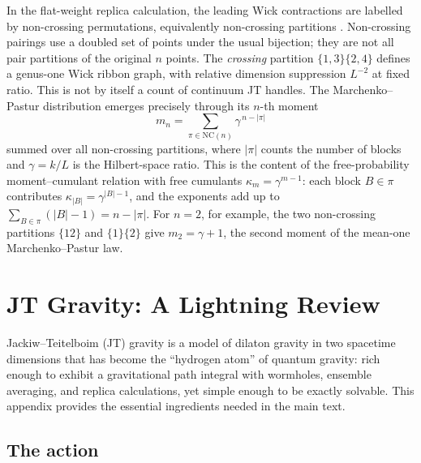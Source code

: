 \documentclass[11pt,letterpaper]{article}
\theoremstyle{plain}
\theoremstyle{definition}
\theoremstyle{remark}
\begin{document}
In the flat-weight replica calculation, the leading Wick contractions are
labelled by non-crossing permutations, equivalently non-crossing partitions
\cite{speicher1994,voiculescu1991}.  Non-crossing pairings use a doubled set
of points under the usual bijection; they are not all pair partitions of the
original $n$ points.  The \emph{crossing} partition
$\{1,3\}\{2,4\}$ defines a genus-one Wick ribbon graph, with relative dimension suppression
$L^{-2}$ at fixed ratio.  This is not by itself a count of continuum JT handles.  The Marchenko--Pastur
distribution emerges precisely through its $n$-th moment
\begin{equation}
  m_n = \sum_{\pi \in \mathrm{NC}(n)}
  \gamma^{\,n - |\pi|}
  \label{eq16:mp_from_nc}
\end{equation}
summed over all non-crossing partitions, where $|\pi|$ counts the number of
blocks and $\gamma = k/L$ is the Hilbert-space ratio.  This is the content of
the free-probability moment--cumulant relation with free cumulants
$\kappa_m = \gamma^{m-1}$: each block $B \in \pi$ contributes
$\kappa_{|B|} = \gamma^{|B|-1}$, and the exponents add up to
$\sum_{B \in \pi} (|B|-1) = n - |\pi|$.  For $n = 2$, for example, the two
non-crossing partitions $\{12\}$ and $\{1\}\{2\}$ give
$m_2 = \gamma + 1$, the second moment of the mean-one Marchenko--Pastur law.


\section{JT Gravity: A Lightning Review}
\label{app:jt_gravity}

Jackiw--Teitelboim (JT) gravity \cite{jackiw1985,teitelboim1983} is a model of
dilaton gravity in two spacetime dimensions that has become the ``hydrogen atom''
of quantum gravity: rich enough to exhibit a gravitational path integral with
wormholes, ensemble averaging, and replica calculations, yet simple enough to
be exactly solvable.  This appendix provides the essential ingredients needed in
the main text.

\subsection{The action}
\end{document}
